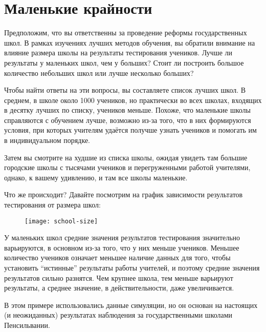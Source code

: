 \section{Маленькие крайности}
\label{chp7:littleextremes}

Предположим, что вы ответственны за проведение реформы государственных школ. В рамках изучениях лучших методов обучения, вы обратили внимание на влияние размера школы на результаты тестирования учеников. Лучше ли результаты у маленьких школ, чем у больших? Стоит ли построить большое количество небольших школ или лучше несколько больших?   

Чтобы найти ответы на эти вопросы, вы составляете список лучших школ. В среднем, в школе около 1000 учеников, но практически во всех школах, входящих в десятку лучших по списку, учеников меньше. Похоже, что маленькие школы справляются с обучением лучше, возможно из-за того, что в них формируются условия, при которых учителям удаётся получше узнать учеников и помогать им в индивидуальном порядке.

Затем вы смотрите на худшие из списка школы, ожидая увидеть там большие городские школы с тысячами учеников и перегруженными работой учителями, однако, к вашему удивлению, и там все школы маленькие. 

Что же происходит? Давайте посмотрим на график зависимости результатов тестирования от размера школ:



\begin{figure}[h!]
    \centering
    \texttt{[image: school-size]}
    \label{fig9:school-size}
\end{figure}

У маленьких школ средние значения результатов тестирования значительно варьируются, в основном из-за того, что у них меньше учеников. Меньшее количество учеников означает меньшее наличие данных для того, чтобы установить ``истинные'' результаты работы учителей, и поэтому средние значения результатов сильно разнятся. Чем крупнее школа, тем меньше варьируют результаты, а среднее значение, в действительности, даже увеличивается.  

В этом примере использовались данные симуляции, но он основан на настоящих (и неожиданных) результатах наблюдения за государственными школами Пенсильвании.\cite{wainer_most_2007}

